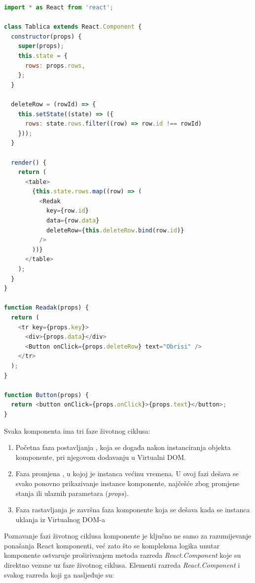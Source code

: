 \documentclass[times, utf8, diplomski, numeric]{fer}
\newcommand{\razmakp}{\vspace{18pt}}
\newcommand{\razmaks}{\vspace{10pt}}
\begin{document}
\razmakp %
\begin{lstlisting}[language=JavaScript, caption={Primjer prosljeđivanja podataka i akcija iz roditeljske komponente}, label={lst:component_props}]
import * as React from 'react';

class Tablica extends React.Component {
  constructor(props) {
    super(props);
    this.state = {
      rows: props.rows,
    };
  }

  deleteRow = (rowId) => {
    this.setState((state) => ({
      rows: state.rows.filter((row) => row.id !== rowId)
    }));
  }

  render() {
    return (
      <table>
        {this.state.rows.map((row) => (
          <Redak
            key={row.id}
            data={row.data}
            deleteRow={this.deleteRow.bind(row.id)}
          />
        ))}
      </table>
    );
  }
}

function Readak(props) {
  return (
    <tr key={props.key}>
      <div>{props.data}</div>
      <Button onClick={props.deleteRow} text="Obrisi" />
    </tr>
  );
}

function Button(props) {
  return <button onClick={props.onClick}>{props.text}</button>;
}
\end{lstlisting}
\razmaks

Svaka komponenta ima tri faze životnog ciklusa:

\begin{enumerate}
    \item Početna faza postavljanja , koja se događa nakon instanciranja objekta komponente, pri njegovom dodavanju u Virtualni DOM.
    \item Faza promjena , u kojoj je instanca većinu vremena. U ovoj fazi dešava se svako ponovno prikazivanje  instance komponente, najčešće zbog promjene stanja ili ulaznih parametara (\emph{props}).
    \item Faza rastavljanja  je završna faza komponente koja se dešava kada se instanca uklanja iz Virtualnog DOM-a
\end{enumerate}
\razmaks

Poznavanje fazi životnog ciklusa komponente je ključno ne samo za razumijevanje ponašanja React komponenti, već zato što se kompleksna logika unutar komponente ostvaruje proširivanjem metoda razreda \emph{React.Component} koje su direktno vezane uz faze životnog ciklusa.
Elementi razreda \emph{React.Component} i svakog razreda koji ga nasljeđuje su\citep{react_docs}:
\end{document}
